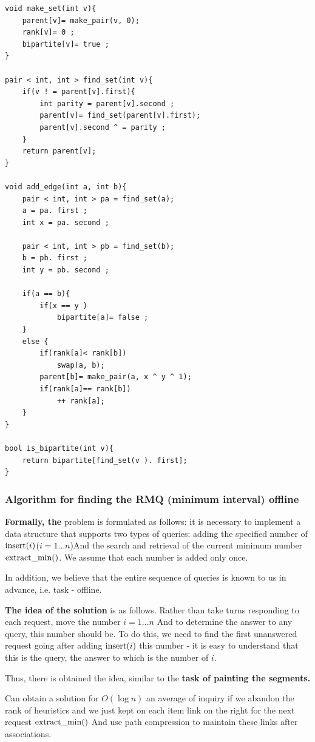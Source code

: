 \begin{verbatim}
void make_set(int v){
    parent[v]= make_pair(v, 0);
    rank[v]= 0 ;
    bipartite[v]= true ;
}
 
pair < int, int > find_set(int v){
    if(v ! = parent[v].first){
        int parity = parent[v].second ;
        parent[v]= find_set(parent[v].first);
        parent[v].second ^ = parity ;
    }
    return parent[v];
}
 
void add_edge(int a, int b){
    pair < int, int > pa = find_set(a);
    a = pa. first ;
    int x = pa. second ;
 
    pair < int, int > pb = find_set(b);
    b = pb. first ;
    int y = pb. second ;
 
    if(a == b){
        if(x == y )
            bipartite[a]= false ;
    }
    else {
        if(rank[a]< rank[b])
            swap(a, b);
        parent[b]= make_pair(a, x ^ y ^ 1);
        if(rank[a]== rank[b])
            ++ rank[a];
    }
}
 
bool is_bipartite(int v){
    return bipartite[find_set(v ). first];
} 
\end{verbatim}
\subsubsection{ Algorithm for finding the RMQ (minimum interval) offline }

\textbf{Formally, the} problem is formulated as follows: it is necessary to implement a data structure that supports two types of queries: adding the specified number of ${\rm insert} (i)$($i = 1 \ldots n$)And the search and retrieval of the current minimum number ${\rm extract \_min}()$. We assume that each number is added only once.

In addition, we believe that the entire sequence of queries is known to us in advance, i.e. task - offline.

\textbf{The idea of the solution} is as follows. Rather than take turns responding to each request, move the number $i = 1 \ldots n$ And to determine the answer to any query, this number should be. To do this, we need to find the first unanswered request going after adding ${\rm insert} (i)$ this number - it is easy to understand that this is the query, the answer to which is the number of $i$.

Thus, there is obtained the idea, similar to the \textbf{task of painting the segments.}

Can obtain a solution for $O (\log n)$ an average of inquiry if we abandon the rank of heuristics and we just kept on each item link on the right for the next request ${\rm extract \_min}()$ And use path compression to maintain these links after associations.

